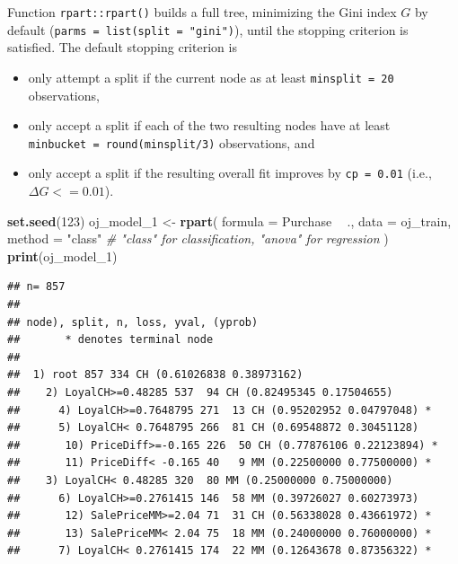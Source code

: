 \documentclass[
]{book}
\newenvironment{Shaded}{\begin{snugshade}}{\end{snugshade}}
\newcommand{\CommentTok}[1]{\textcolor[rgb]{0.56,0.35,0.01}{\textit{#1}}}
\newcommand{\DataTypeTok}[1]{\textcolor[rgb]{0.13,0.29,0.53}{#1}}
\newcommand{\DecValTok}[1]{\textcolor[rgb]{0.00,0.00,0.81}{#1}}
\newcommand{\KeywordTok}[1]{\textcolor[rgb]{0.13,0.29,0.53}{\textbf{#1}}}
\newcommand{\NormalTok}[1]{#1}
\newcommand{\OperatorTok}[1]{\textcolor[rgb]{0.81,0.36,0.00}{\textbf{#1}}}
\newcommand{\StringTok}[1]{\textcolor[rgb]{0.31,0.60,0.02}{#1}}
\providecommand{\tightlist}{%
  \setlength{\itemsep}{0pt}\setlength{\parskip}{0pt}}
\begin{document}
Function \texttt{rpart::rpart()} builds a full tree, minimizing the Gini index \(G\) by default (\texttt{parms\ =\ list(split\ =\ "gini")}), until the stopping criterion is satisfied. The default stopping criterion is

\begin{itemize}
\tightlist
\item
  only attempt a split if the current node as at least \texttt{minsplit\ =\ 20} observations,
\item
  only accept a split if each of the two resulting nodes have at least \texttt{minbucket\ =\ round(minsplit/3)} observations, and
\item
  only accept a split if the resulting overall fit improves by \texttt{cp\ =\ 0.01} (i.e., \(\Delta G <= 0.01\)).
\end{itemize}

\begin{Shaded}
\begin{Highlighting}[]
\KeywordTok{set.seed}\NormalTok{(}\DecValTok{123}\NormalTok{)}
\NormalTok{oj_model_}\DecValTok{1}\NormalTok{ <-}\StringTok{ }\KeywordTok{rpart}\NormalTok{(}
   \DataTypeTok{formula =}\NormalTok{ Purchase }\OperatorTok{~}\StringTok{ }\NormalTok{.,}
   \DataTypeTok{data =}\NormalTok{ oj_train,}
   \DataTypeTok{method =} \StringTok{"class"}  \CommentTok{# "class" for classification, "anova" for regression}
\NormalTok{   )}
\KeywordTok{print}\NormalTok{(oj_model_}\DecValTok{1}\NormalTok{)}
\end{Highlighting}
\end{Shaded}

\begin{verbatim}
## n= 857 
## 
## node), split, n, loss, yval, (yprob)
##       * denotes terminal node
## 
##  1) root 857 334 CH (0.61026838 0.38973162)  
##    2) LoyalCH>=0.48285 537  94 CH (0.82495345 0.17504655)  
##      4) LoyalCH>=0.7648795 271  13 CH (0.95202952 0.04797048) *
##      5) LoyalCH< 0.7648795 266  81 CH (0.69548872 0.30451128)  
##       10) PriceDiff>=-0.165 226  50 CH (0.77876106 0.22123894) *
##       11) PriceDiff< -0.165 40   9 MM (0.22500000 0.77500000) *
##    3) LoyalCH< 0.48285 320  80 MM (0.25000000 0.75000000)  
##      6) LoyalCH>=0.2761415 146  58 MM (0.39726027 0.60273973)  
##       12) SalePriceMM>=2.04 71  31 CH (0.56338028 0.43661972) *
##       13) SalePriceMM< 2.04 75  18 MM (0.24000000 0.76000000) *
##      7) LoyalCH< 0.2761415 174  22 MM (0.12643678 0.87356322) *
\end{verbatim}
\end{document}
